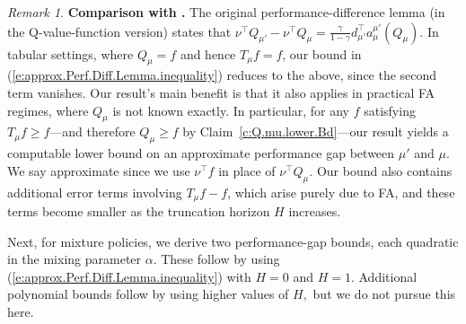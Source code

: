 \documentclass[twoside]{article}
\theoremstyle{plain}
\theoremstyle{definition}
\theoremstyle{remark}
\newtheorem{remark}[theorem]{Remark}
\newcommand{\tr}{\top}
\newcommand{\mup}{\mu'}
\renewcommand{\eqref}[1]{(\ref{#1})}
\begin{document}
\begin{remark}
    \textbf{Comparison with \citep{kakade2002approximately}.} The original performance-difference lemma (in the Q-value-function version) states that 
    \(
        \nu^\tr Q_{\mup} - \nu^\tr Q_{\mu} = \frac{\gamma}{1 - \gamma} d_{\mup}^\tr a_{\mu}^{\mup}( Q_{\mu}).
    \)
    In tabular settings, where $Q_\mu=f$ and hence $T_\mu f=f$, our bound in \eqref{e:approx.Perf.Diff.Lemma.inequality} reduces to the above, since the second term vanishes. Our result's main benefit is that it also applies in practical FA regimes, where $Q_\mu$ is not known exactly. In particular, for any $f$ satisfying $T_\mu f \geq f$---and therefore $Q_\mu \geq f$ by Claim~\ref{c:Q.mu.lower.Bd}---our result yields a computable lower bound on an approximate performance gap between $\mup$ and $\mu$. We say approximate since we use $\nu^\tr f$ in place of $\nu^\tr Q_\mu.$ Our bound also contains additional error terms involving $T_\mu f - f$, which arise purely due to FA, and these terms become smaller as the truncation horizon $H$ increases.
\end{remark}

Next, for mixture policies, we derive two performance-gap bounds, each quadratic in the mixing parameter $\alpha$. These follow by using \eqref{e:approx.Perf.Diff.Lemma.inequality} with $H = 0$ and $H = 1.$ Additional polynomial bounds follow by using higher values of $H,$ but we do not pursue this here.
\end{document}
